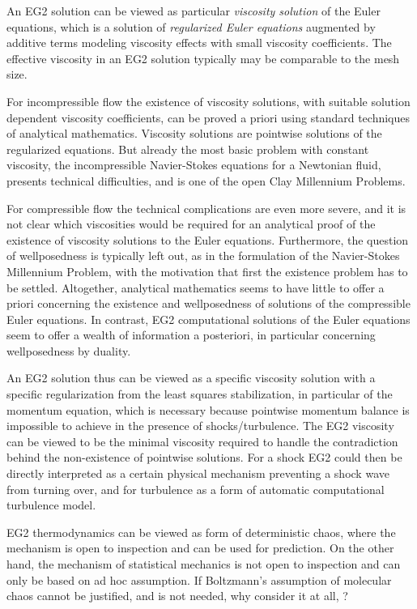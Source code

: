An EG2 solution can be viewed as particular \emph{viscosity solution}
of the Euler equations, which is a solution of \emph{regularized
Euler equations} augmented by additive terms modeling viscosity
effects with small viscosity coefficients. The effective viscosity in an
EG2 solution typically may be comparable to the mesh size.

For incompressible flow the existence of viscosity solutions,
with suitable solution dependent viscosity coefficients, can
be proved a priori using standard techniques of analytical mathematics.
Viscosity solutions are pointwise solutions of the regularized
equations.
But already the most basic problem with constant viscosity,
the incompressible Navier-Stokes equations for a Newtonian fluid, presents
technical difficulties, and is one of the open Clay Millennium Problems.

For compressible flow the technical complications are even more
severe, and it is not clear which viscosities would be required
for an analytical proof of the existence of viscosity
solutions \cite{feireisl} to the Euler equations.
Furthermore, the question of wellposedness is typically left out,
as in the formulation of the Navier-Stokes Millennium Problem,
with the motivation that first the existence problem has to be settled.
Altogether, analytical mathematics seems to have little to offer a
priori concerning
the existence and wellposedness of solutions of the compressible Euler
equations.
In contrast, EG2 computational solutions of the Euler equations
seem to offer a wealth of information a posteriori, in particular
concerning wellposedness by duality.

An EG2 solution thus can be viewed as a specific viscosity solution with
a specific regularization from the least squares stabilization, in particular
of the momentum equation, which is necessary because pointwise momentum balance
is impossible to achieve in the presence of shocks/turbulence.
The EG2 viscosity can be viewed
to be the minimal viscosity required to handle the contradiction
behind the non-existence of pointwise solutions.
For a shock EG2 could then be directly interpreted as
a certain physical mechanism preventing a shock wave from turning over,
and for turbulence as a form of automatic computational turbulence
model.

EG2 thermodynamics can be viewed as form of deterministic
chaos, where the mechanism is open to inspection and can be
used for prediction. On the other hand, the mechanism
of statistical mechanics is not open to inspection and
can only be based on ad hoc assumption. If Boltzmann's
assumption of molecular chaos cannot be justified, and
is not needed, why consider it at all, \cite{loschmidt}?

